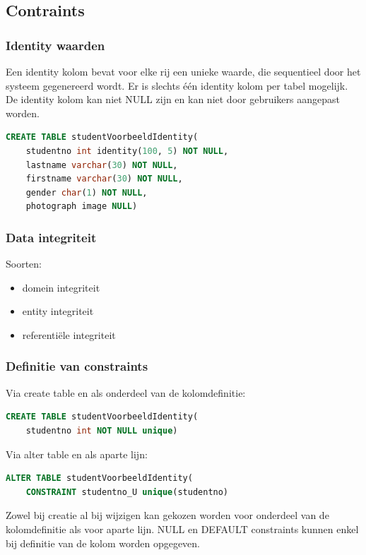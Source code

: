 \documentclass[a4paper,12pt]{article}
\begin{document}
\subsection{Contraints}
\subsubsection{Identity waarden}
Een identity kolom bevat voor elke rij een unieke waarde, die sequentieel door het systeem gegenereerd wordt.
Er is slechts één identity kolom per tabel mogelijk.
De identity kolom kan niet NULL zijn en kan niet door gebruikers aangepast worden.

\begin{lstlisting}[language=sql, breaklines=true]
CREATE TABLE studentVoorbeeldIdentity(
	studentno int identity(100, 5) NOT NULL,
	lastname varchar(30) NOT NULL,
	firstname varchar(30) NOT NULL,
	gender char(1) NOT NULL,
	photograph image NULL)
\end{lstlisting}

\subsubsection{Data integriteit}
Soorten:
\begin{itemize}
\item domein integriteit
\item entity integriteit
\item referentiële integriteit
\end{itemize}

\subsubsection{Definitie van constraints}
Via create table en als onderdeel van de kolomdefinitie:
\begin{lstlisting}[language=sql, breaklines=true]
CREATE TABLE studentVoorbeeldIdentity(
	studentno int NOT NULL unique)
\end{lstlisting}

Via alter table en als aparte lijn:
\begin{lstlisting}[language=sql, breaklines=true]
ALTER TABLE studentVoorbeeldIdentity(
	CONSTRAINT studentno_U unique(studentno)
\end{lstlisting}

Zowel bij creatie al bij wijzigen kan gekozen worden voor onderdeel van de kolomdefinitie als voor aparte lijn.
NULL en DEFAULT constraints kunnen enkel bij definitie van de kolom worden opgegeven.
\end{document}
